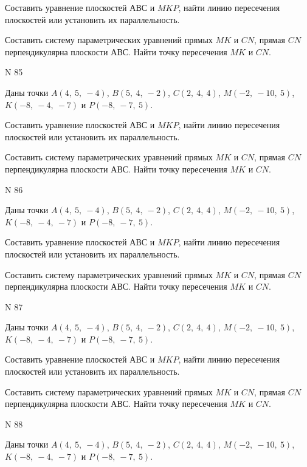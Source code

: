 \documentclass[11pt]{report}
\begin{document}
Составить уравнение плоскостей $АВС$ и $MKP$,
найти линию пересечения плоскостей или установить их параллельность.

Составить систему параметрических уравнений прямых $MK$ и $CN$,
прямая $CN$ перпендикулярна плоскости $АВС$. 
Найти точку пересечения $MK$ и $CN$.



 N 85

Даны точки $A\left( 4, \  5, \  -4\right)$, $B\left( 5, \  4, \  -2\right)$, $C\left( 2, \  4, \  4\right)$, $M\left( -2, \  -10, \  5\right)$, $K\left( -8, \  -4, \  -7\right)$ и $P\left( -8, \  -7, \  5\right)$.


Составить уравнение плоскостей $АВС$ и $MKP$,
найти линию пересечения плоскостей или установить их параллельность.

Составить систему параметрических уравнений прямых $MK$ и $CN$,
прямая $CN$ перпендикулярна плоскости $АВС$. 
Найти точку пересечения $MK$ и $CN$.



 N 86

Даны точки $A\left( 4, \  5, \  -4\right)$, $B\left( 5, \  4, \  -2\right)$, $C\left( 2, \  4, \  4\right)$, $M\left( -2, \  -10, \  5\right)$, $K\left( -8, \  -4, \  -7\right)$ и $P\left( -8, \  -7, \  5\right)$.


Составить уравнение плоскостей $АВС$ и $MKP$,
найти линию пересечения плоскостей или установить их параллельность.

Составить систему параметрических уравнений прямых $MK$ и $CN$,
прямая $CN$ перпендикулярна плоскости $АВС$. 
Найти точку пересечения $MK$ и $CN$.



 N 87

Даны точки $A\left( 4, \  5, \  -4\right)$, $B\left( 5, \  4, \  -2\right)$, $C\left( 2, \  4, \  4\right)$, $M\left( -2, \  -10, \  5\right)$, $K\left( -8, \  -4, \  -7\right)$ и $P\left( -8, \  -7, \  5\right)$.


Составить уравнение плоскостей $АВС$ и $MKP$,
найти линию пересечения плоскостей или установить их параллельность.

Составить систему параметрических уравнений прямых $MK$ и $CN$,
прямая $CN$ перпендикулярна плоскости $АВС$. 
Найти точку пересечения $MK$ и $CN$.



 N 88

Даны точки $A\left( 4, \  5, \  -4\right)$, $B\left( 5, \  4, \  -2\right)$, $C\left( 2, \  4, \  4\right)$, $M\left( -2, \  -10, \  5\right)$, $K\left( -8, \  -4, \  -7\right)$ и $P\left( -8, \  -7, \  5\right)$.
\end{document}
